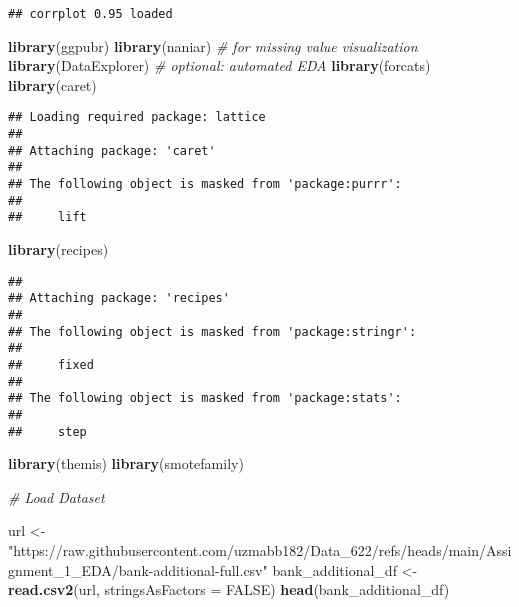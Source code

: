 \documentclass[
]{article}
\newenvironment{Shaded}{\begin{snugshade}}{\end{snugshade}}
\newcommand{\AttributeTok}[1]{\textcolor[rgb]{0.13,0.29,0.53}{#1}}
\newcommand{\CommentTok}[1]{\textcolor[rgb]{0.56,0.35,0.01}{\textit{#1}}}
\newcommand{\ConstantTok}[1]{\textcolor[rgb]{0.56,0.35,0.01}{#1}}
\newcommand{\FunctionTok}[1]{\textcolor[rgb]{0.13,0.29,0.53}{\textbf{#1}}}
\newcommand{\NormalTok}[1]{#1}
\newcommand{\OtherTok}[1]{\textcolor[rgb]{0.56,0.35,0.01}{#1}}
\newcommand{\StringTok}[1]{\textcolor[rgb]{0.31,0.60,0.02}{#1}}
\begin{document}
\begin{verbatim}
## corrplot 0.95 loaded
\end{verbatim}

\begin{Shaded}
\begin{Highlighting}[]
\FunctionTok{library}\NormalTok{(ggpubr)}
\FunctionTok{library}\NormalTok{(naniar)     }\CommentTok{\# for missing value visualization}
\FunctionTok{library}\NormalTok{(DataExplorer) }\CommentTok{\# optional: automated EDA}
\FunctionTok{library}\NormalTok{(forcats)}
\FunctionTok{library}\NormalTok{(caret)}
\end{Highlighting}
\end{Shaded}

\begin{verbatim}
## Loading required package: lattice
## 
## Attaching package: 'caret'
## 
## The following object is masked from 'package:purrr':
## 
##     lift
\end{verbatim}

\begin{Shaded}
\begin{Highlighting}[]
\FunctionTok{library}\NormalTok{(recipes)}
\end{Highlighting}
\end{Shaded}

\begin{verbatim}
## 
## Attaching package: 'recipes'
## 
## The following object is masked from 'package:stringr':
## 
##     fixed
## 
## The following object is masked from 'package:stats':
## 
##     step
\end{verbatim}

\begin{Shaded}
\begin{Highlighting}[]
\FunctionTok{library}\NormalTok{(themis)}
\FunctionTok{library}\NormalTok{(smotefamily)}
\end{Highlighting}
\end{Shaded}

\begin{Shaded}
\begin{Highlighting}[]
\CommentTok{\# Load Dataset}

\NormalTok{url }\OtherTok{\textless{}{-}} \StringTok{"https://raw.githubusercontent.com/uzmabb182/Data\_622/refs/heads/main/Assignment\_1\_EDA/bank{-}additional{-}full.csv"}
\NormalTok{bank\_additional\_df }\OtherTok{\textless{}{-}} \FunctionTok{read.csv2}\NormalTok{(url, }\AttributeTok{stringsAsFactors =} \ConstantTok{FALSE}\NormalTok{)}
\FunctionTok{head}\NormalTok{(bank\_additional\_df)}
\end{Highlighting}
\end{Shaded}
\end{document}
